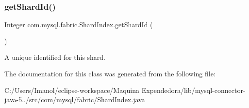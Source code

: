 \subsubsection{\texorpdfstring{get\+Shard\+Id()}{getShardId()}}
{\footnotesize\ttfamily Integer com.\+mysql.\+fabric.\+Shard\+Index.\+get\+Shard\+Id (\begin{DoxyParamCaption}{ }\end{DoxyParamCaption})}

A unique identified for this shard. 

The documentation for this class was generated from the following file\+:\begin{DoxyCompactItemize}
\item 
C\+:/\+Users/\+Imanol/eclipse-\/workspace/\+Maquina Expendedora/lib/mysql-\/connector-\/java-\/5../src/com/mysql/fabric/Shard\+Index.\+java\end{DoxyCompactItemize}
